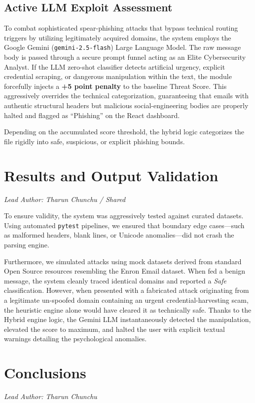 \documentclass[conference]{IEEEtran}
\begin{document}
\subsection{Active LLM Exploit Assessment}
To combat sophisticated spear-phishing attacks that bypass technical routing triggers by utilizing legitimately acquired domains, the system employs the Google Gemini (\texttt{gemini-2.5-flash}) Large Language Model. The raw message body is passed through a secure prompt funnel acting as an Elite Cybersecurity Analyst. If the LLM zero-shot classifier detects artificial urgency, explicit credential scraping, or dangerous manipulation within the text, the module forcefully injects a \textbf{+5 point penalty} to the baseline Threat Score. This aggressively overrides the technical categorization, guaranteeing that emails with authentic structural headers but malicious social-engineering bodies are properly halted and flagged as ``Phishing'' on the React dashboard.

Depending on the accumulated score threshold, the hybrid logic categorizes the file rigidly into safe, suspicious, or explicit phishing bounds.

\section{Results and Output Validation}
\textit{Lead Author: Tharun Chunchu / Shared}

To ensure validity, the system was aggressively tested against curated datasets. Using automated \texttt{pytest} pipelines, we ensured that boundary edge cases—such as malformed headers, blank lines, or Unicode anomalies—did not crash the parsing engine.

Furthermore, we simulated attacks using mock datasets derived from standard Open Source resources resembling the Enron Email dataset. When fed a benign message, the system cleanly traced identical domains and reported a \textit{Safe} classification. However, when presented with a fabricated attack originating from a legitimate un-spoofed domain containing an urgent credential-harvesting scam, the heuristic engine alone would have cleared it as technically safe. Thanks to the Hybrid engine logic, the Gemini LLM instantaneously detected the manipulation, elevated the score to maximum, and halted the user with explicit textual warnings detailing the psychological anomalies. 

\section{Conclusions}
\textit{Lead Author: Tharun Chunchu}
\end{document}
